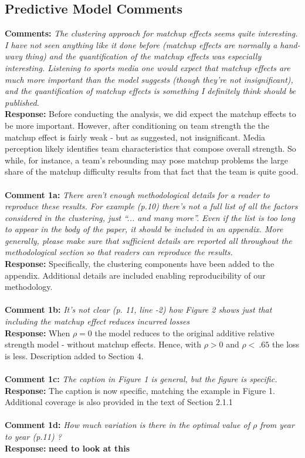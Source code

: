 \documentclass[11pt]{article} %
\begin{document}
\subsection*{Predictive Model Comments}
{\bf Comments:}  \emph{The clustering approach for matchup effects seems quite interesting. I have not seen anything like it done before (matchup effects are normally a hand-wavy thing) and the quantification of the matchup effects was especially interesting. Listening to sports media one would expect that matchup effects are much more important than the model suggests (though they're not insignificant), and the quantification of matchup effects is something I definitely think should be published}. \\
{\bf Response:} Before conducting the analysis, we did expect the matchup effects to be more important. However, after conditioning on team strength the the matchup effect is fairly weak - but as suggested, not insignificant. Media perception likely identifies team characteristics that compose overall strength. So while, for instance, a team's rebounding may pose matchup problems the large share of the matchup difficulty results from that fact that the team is quite good. \\
\\
{\bf Comment 1a:}  \emph{There aren't enough methodological details for a reader to reproduce these results. For example (p.10) there's not a full list of all the factors considered in the clustering, just ``... and many more''. Even if the list is too long to appear in the body of the paper, it should be included in an appendix. More generally, please make sure that sufficient details are reported all throughout the methodological section so that readers can reproduce the results.} \\
{\bf Response:} Specifically, the clustering components have been added to the appendix. Additional details are included enabling reproducibility of our methodology. \\
\\
{\bf Comment 1b:}  \emph{It's not clear (p. 11, line -2) how Figure 2 shows just that including the matchup effect reduces incurred losses} \\
{\bf Response:} When $\rho=0$ the model reduces to the original additive relative strength model - without matchup effects. Hence, with $\rho > 0$ and $\rho < ~.65$ the loss is less. Description added to Section 4.\\
\\
{\bf Comment 1c:}  \emph{The caption in Figure 1 is general, but the figure is specific.} \\
{\bf Response:} The caption is now specific, matching the example in Figure 1. Additional coverage is also provided in the text of Section 2.1.1\\
\\
{\bf Comment 1d:}  \emph{How much variation is there in the optimal value of $\rho$ from year to year (p.11) ?} \\
{\bf Response:} {\bf need to look at this}\\
\\
\end{document}
